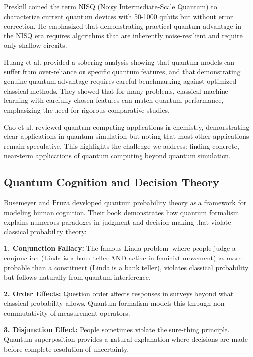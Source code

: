 \documentclass[11pt,letterpaper]{article}
\begin{document}
Preskill \cite{preskill2018quantum} coined the term NISQ (Noisy Intermediate-Scale Quantum) to characterize current quantum devices with 50-1000 qubits but without error correction. He emphasized that demonstrating practical quantum advantage in the NISQ era requires algorithms that are inherently noise-resilient and require only shallow circuits.

Huang et al. \cite{huang2021power} provided a sobering analysis showing that quantum models can suffer from over-reliance on specific quantum features, and that demonstrating genuine quantum advantage requires careful benchmarking against optimized classical methods. They showed that for many problems, classical machine learning with carefully chosen features can match quantum performance, emphasizing the need for rigorous comparative studies.

Cao et al. \cite{cao2019quantum} reviewed quantum computing applications in chemistry, demonstrating clear applications in quantum simulation but noting that most other applications remain speculative. This highlights the challenge we address: finding concrete, near-term applications of quantum computing beyond quantum simulation.

\subsection{Quantum Cognition and Decision Theory}

Busemeyer and Bruza \cite{busemeyer2012quantum} developed quantum probability theory as a framework for modeling human cognition. Their book demonstrates how quantum formalism explains numerous paradoxes in judgment and decision-making that violate classical probability theory:

\textbf{1. Conjunction Fallacy:} The famous Linda problem, where people judge a conjunction (Linda is a bank teller AND active in feminist movement) as more probable than a constituent (Linda is a bank teller), violates classical probability but follows naturally from quantum interference.

\textbf{2. Order Effects:} Question order affects responses in surveys beyond what classical probability allows. Quantum formalism models this through non-commutativity of measurement operators.

\textbf{3. Disjunction Effect:} People sometimes violate the sure-thing principle. Quantum superposition provides a natural explanation where decisions are made before complete resolution of uncertainty.
\end{document}
